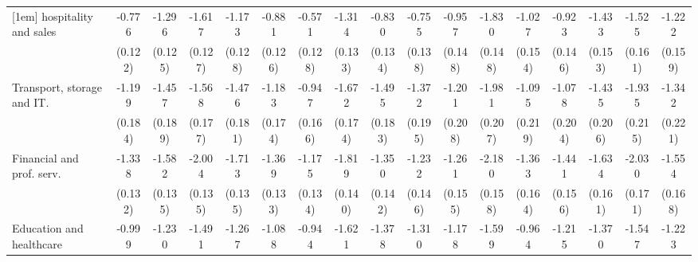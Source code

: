 {\begin{tabular}{l*{16}{c}}
[1em]
hospitality and sales&      -0.776\sym{***}&      -1.296\sym{***}&      -1.617\sym{***}&      -1.173\sym{***}&      -0.881\sym{***}&      -0.571\sym{***}&      -1.314\sym{***}&      -0.830\sym{***}&      -0.755\sym{***}&      -0.957\sym{***}&      -1.830\sym{***}&      -1.027\sym{***}&      -0.923\sym{***}&      -1.433\sym{***}&      -1.525\sym{***}&      -1.222\sym{***}\\
                    &     (0.122)         &     (0.125)         &     (0.127)         &     (0.128)         &     (0.126)         &     (0.128)         &     (0.133)         &     (0.134)         &     (0.138)         &     (0.148)         &     (0.148)         &     (0.154)         &     (0.146)         &     (0.153)         &     (0.161)         &     (0.159)         \\
[1em]
Transport, storage and IT.&      -1.199\sym{***}&      -1.457\sym{***}&      -1.568\sym{***}&      -1.476\sym{***}&      -1.183\sym{***}&      -0.947\sym{***}&      -1.672\sym{***}&      -1.495\sym{***}&      -1.372\sym{***}&      -1.201\sym{***}&      -1.981\sym{***}&      -1.095\sym{***}&      -1.078\sym{***}&      -1.435\sym{***}&      -1.935\sym{***}&      -1.342\sym{***}\\
                    &     (0.184)         &     (0.189)         &     (0.177)         &     (0.181)         &     (0.174)         &     (0.166)         &     (0.174)         &     (0.183)         &     (0.195)         &     (0.208)         &     (0.207)         &     (0.219)         &     (0.204)         &     (0.206)         &     (0.215)         &     (0.221)         \\
[1em]
Financial and prof. serv.&      -1.338\sym{***}&      -1.582\sym{***}&      -2.004\sym{***}&      -1.713\sym{***}&      -1.369\sym{***}&      -1.175\sym{***}&      -1.819\sym{***}&      -1.350\sym{***}&      -1.232\sym{***}&      -1.261\sym{***}&      -2.180\sym{***}&      -1.363\sym{***}&      -1.441\sym{***}&      -1.634\sym{***}&      -2.030\sym{***}&      -1.554\sym{***}\\
                    &     (0.132)         &     (0.135)         &     (0.135)         &     (0.135)         &     (0.133)         &     (0.134)         &     (0.140)         &     (0.142)         &     (0.146)         &     (0.155)         &     (0.158)         &     (0.164)         &     (0.156)         &     (0.161)         &     (0.171)         &     (0.168)         \\
[1em]
Education and healthcare&      -0.999\sym{***}&      -1.230\sym{***}&      -1.491\sym{***}&      -1.267\sym{***}&      -1.088\sym{***}&      -0.944\sym{***}&      -1.621\sym{***}&      -1.378\sym{***}&      -1.310\sym{***}&      -1.178\sym{***}&      -1.599\sym{***}&      -0.964\sym{***}&      -1.215\sym{***}&      -1.370\sym{***}&      -1.547\sym{***}&      -1.223\sym{***}\\

\end{tabular}}
